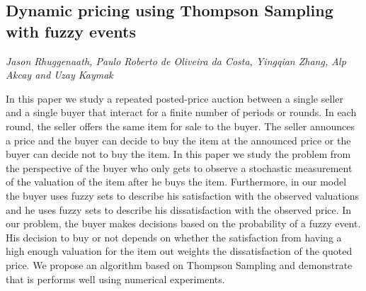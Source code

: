 \documentclass[../booklet.tex]{subfiles}
\begin{document}
\subsection[Dynamic pricing using Thompson Sampling with fuzzy events. {\it Jason Rhuggenaath, Paulo Roberto de Oliveira da Costa, Yingqian Zhang, Alp Akcay and Uzay Kaymak}]{Dynamic pricing using Thompson Sampling with fuzzy events}
    

\begin{center}
  {\it Jason Rhuggenaath, Paulo Roberto de Oliveira da Costa, Yingqian Zhang, Alp Akcay and Uzay Kaymak}
\end{center}

\vskip 0.8cm


In this paper we study  a repeated posted-price auction between a single seller and a single buyer that interact for a finite number of periods or rounds. In each round, the seller offers the same item for sale to the buyer. The seller announces a price and the buyer can decide to buy the item at the announced price or the buyer can decide not to buy the item. In this paper we study the problem from the perspective of the buyer who only gets to observe a stochastic measurement of the valuation of the item after he buys the item. Furthermore, in our model the buyer uses fuzzy sets to describe his satisfaction with the observed valuations and he uses fuzzy sets to describe his dissatisfaction with the observed price. In our problem, the buyer makes decisions based on the probability of a fuzzy event. His decision to buy or not depends on whether the satisfaction from having a high enough valuation for the item out weights the dissatisfaction of the quoted price.  We propose an algorithm based on Thompson Sampling and demonstrate that is performs well using numerical experiments. 
\end{document}
